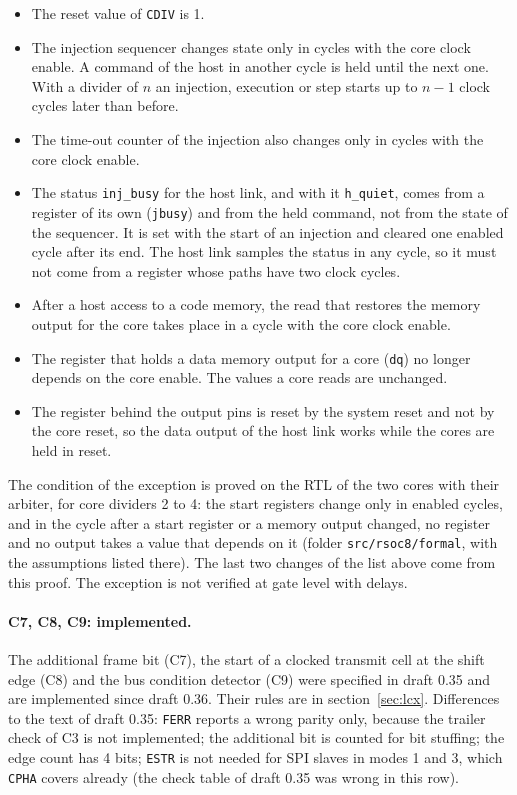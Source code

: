 \documentclass[10pt,a4paper]{article}
\newcommand{\reg}[1]{\texttt{#1}}
\begin{document}
\begin{itemize}
\item The reset value of \reg{CDIV} is 1.
\item The injection sequencer changes state only in cycles with the core clock enable. A command of the host
in another cycle is held until the next one. With a divider of $n$ an injection, execution or step starts up
to $n-1$ clock cycles later than before.
\item The time-out counter of the injection also changes only in cycles with the core clock enable.
\item The status \texttt{inj\_busy} for the host link, and with it \texttt{h\_quiet}, comes from a register of its
own (\texttt{jbusy}) and from the held command, not from the state of the sequencer. It is set with the start
of an injection and cleared one enabled cycle after its end. The host link samples the status in any cycle, so
it must not come from a register whose paths have two clock cycles.
\item After a host access to a code memory, the read that restores the memory output for the core takes place
in a cycle with the core clock enable.
\item The register that holds a data memory output for a core (\texttt{dq}) no longer depends on the core
enable. The values a core reads are unchanged.
\item The register behind the output pins is reset by the system reset and not by the core reset, so the data
output of the host link works while the cores are held in reset.
\end{itemize}

The condition of the exception is proved on the RTL of the two cores with their arbiter, for core dividers 2
to 4: the start registers change only in enabled cycles, and in the cycle after a start register or a memory
output changed, no register and no output takes a value that depends on it (folder \texttt{src/rsoc8/formal},
with the assumptions listed there). The last two changes of the list above come from this proof. The exception
is not verified at gate level with delays.

\paragraph{C7, C8, C9: implemented.} The additional frame bit (C7), the start of a clocked transmit cell at the shift edge (C8) and the bus condition detector (C9) were specified in draft 0.35 and are implemented since draft 0.36. Their rules are in section~\ref{sec:lcx}. Differences to the text of draft 0.35: \reg{FERR} reports a wrong parity only, because the trailer check of C3 is not implemented; the additional bit is counted for bit stuffing; the edge count has 4 bits; \reg{ESTR} is not needed for SPI slaves in modes 1 and 3, which \reg{CPHA} covers already (the check table of draft 0.35 was wrong in this row).
\end{document}
